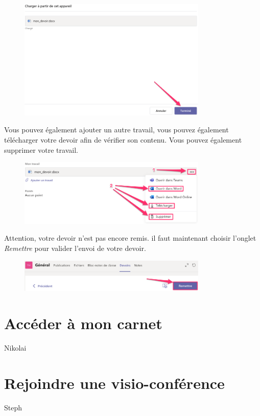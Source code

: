 \begin{figure}[H]
\includegraphics[width=9cm]{./images/teams/ajout2}
\centering
\end{figure}

Vous pouvez également ajouter un autre travail, vous pouvez également télécharger votre devoir afin de vérifier son contenu. Vous pouvez également supprimer votre travail.

\begin{figure}[H]
\includegraphics[width=9cm]{./images/teams/ajout3}
\centering
\end{figure}

Attention, votre devoir n'est pas encore remis. il faut maintenant choisir l'onglet \textit{Remettre} pour valider l'envoi de votre devoir. 

\begin{figure}[H]
\includegraphics[width=9cm]{./images/teams/ajout4}
\centering
\end{figure}


\section{Accéder à mon carnet}

Nikolai

\section{Rejoindre une visio-conférence}

Steph


